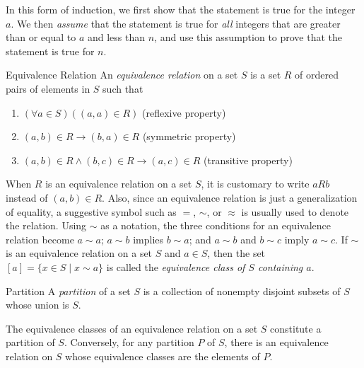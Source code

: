 \documentclass[../butidigress.tex]{subfiles}
\begin{document}
In this form of induction, we first show that the statement is true for the integer $a$.
We then \emph{assume} that the statement is true for \emph{all} integers that are greater than or equal to $a$ and less than $n$, and use this assumption to prove that the statement is true for $n$.


\begin{definition}{Equivalence Relation}
An \emph{equivalence relation} on a set $S$ is a set $R$ of ordered pairs of elements in $S$ such that
\begin{enumerate}\mathlist
    \item $(\forall a\in S)((a,a) \in R)$ (reflexive property)
    \item $(a,b) \in R \rightarrow (b,a) \in R$ (symmetric property)
    \item $(a,b) \in R \wedge (b,c) \in R \rightarrow (a,c) \in R$ (transitive property)
\end{enumerate}
\end{definition}

When $R$ is an equivalence relation on a set $S$, it is customary to write $aRb$ instead of $(a,b) \in R$.
Also, since an equivalence relation is just a generalization of equality, a suggestive symbol such as $=$, $\sim$, or $\approx$ is usually used to denote the relation.
Using $\sim$ as a notation, the three conditions for an equivalence relation become $a\sim a$; $a\sim b$ implies $b\sim a$; and $a\sim b$ and $b\sim c$ imply $a\sim c$.
If $\sim$ is an equivalence relation on a set $S$ and $a \in S$, then the set $[a] = \{ x \in S \mid x\sim a\}$ is called the \emph{equivalence class of $S$ containing $a$}.

\begin{definition}{Partition}
A \emph{partition} of a set $S$ is a collection of nonempty disjoint subsets of $S$ whose union is $S$.
\end{definition}

\begin{theorem}
The equivalence classes of an equivalence relation on a set $S$ constitute a partition of $S$.
Conversely, for any partition $P$ of $S$, there is an equivalence relation on $S$ whose equivalence classes are the elements of $P$.
\end{theorem}
\end{document}
